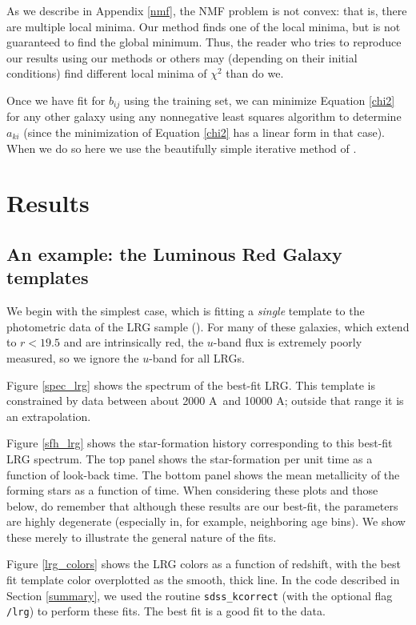 \documentclass[10pt,preprint]{aastex}
\renewcommand{\AA}{A}
\begin{document}
As we describe in Appendix \ref{nmf}, the NMF problem is not convex:
that is, there are multiple local minima. Our method finds one of the
local minima, but is not guaranteed to find the global minimum. Thus,
the reader who tries to reproduce our results using our methods or
others may (depending on their initial conditions) find different
local minima of $\chi^2$ than do we.

Once we have fit for $b_{ij}$ using the training set, we can minimize
Equation \ref{chi2} for any other galaxy using any nonnegative least
squares algorithm to determine $a_{ki}$ (since the minimization of
Equation \ref{chi2} has a linear form in that case).  When we do so
here we use the beautifully simple iterative method of \citet{sha02a}.

\section{Results}
\label{results}

\subsection{An example: the Luminous Red Galaxy templates}

We begin with the simplest case, which is fitting a {\it single}
template to the photometric data of the LRG sample
(\citealt{eisenstein01a}). For many of these galaxies, which extend to
$r<19.5$ and are intrinsically red, the $u$-band flux is extremely
poorly measured, so we ignore the $u$-band for all LRGs. 

Figure \ref{spec_lrg} shows the spectrum of the best-fit LRG.  This
template is constrained by data between about 2000 \AA\ and 10000 \AA;
outside that range it is an extrapolation.

Figure \ref{sfh_lrg} shows the star-formation history corresponding to
this best-fit LRG spectrum. The top panel shows the star-formation per
unit time as a function of look-back time.  The bottom panel shows the
mean metallicity of the forming stars as a function of time.  When
considering these plots and those below, do remember that although
these results are our best-fit, the parameters are highly degenerate
(especially in, for example, neighboring age bins).  We show these
merely to illustrate the general nature of the fits.

Figure \ref{lrg_colors} shows the LRG colors as a function of
redshift, with the best fit template color overplotted as the smooth,
thick line. In the code described in Section \ref{summary}, we used the
routine {\tt sdss\_kcorrect} (with the optional flag {\tt /lrg}) to
perform these fits. The best fit is a good fit to the data.
\end{document}
